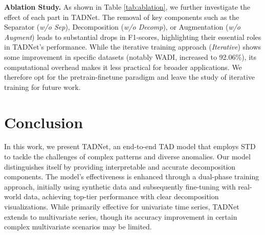 \documentclass{article}
\begin{document}


\textbf{Ablation Study.}
As shown in Table \ref{tab:ablation}, we further investigate the effect of each part in TADNet. The removal of key components such as the Separator (\textit{w/o Sep}), Decomposition (\textit{w/o Decomp}), or Augmentation (\textit{w/o Augment}) leads to substantial drops in F1-scores, highlighting their essential roles in TADNet's performance. While the iterative training approach (\textit{Iterative}) shows some improvement in specific datasets (notably WADI, increased to 92.06\%), its computational overhead makes it less practical for broader applications. We therefore opt for the pretrain-finetune paradigm and leave the study of iterative training for future work.

\section{Conclusion}
In this work, we present TADNet, an end-to-end TAD model that employs STD to tackle the challenges of complex patterns and diverse anomalies. Our model distinguishes itself by providing interpretable and accurate decomposition components. The model's effectiveness is enhanced through a dual-phase training approach, initially using synthetic data and subsequently fine-tuning with real-world data, achieving top-tier performance with clear decomposition visualizations. While primarily effective for univariate time series, TADNet extends to multivariate series, though its accuracy improvement in certain complex multivariate scenarios may be limited.
% 





\vfill\pagebreak

{
\ninept

}
\end{document}
